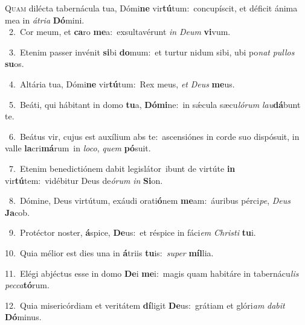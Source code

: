 \lettrine{\initial\textcolor{\initialcolor}{Q}}{uam} dilécta tabernácula tua, Dómi\textbf{ne} vir\-\textbf{tú}\-tum:~\star concupíscit, et déficit ánima mea in \textit{á}\-\textit{tri}\textit{a} \textbf{Dó}\-mini.\\
{\numbfont\textcolor{\numbcolor}{~2.}}~Cor meum, et \textbf{ca}\-ro \textbf{me}\-a:~\star exsultavérunt \textit{in} \textit{De}\-\textit{um} \textbf{vi}\-vum.\par
{\numbfont\textcolor{\numbcolor}{~3.}}~Etenim passer invénit \textbf{si}\-bi \textbf{do}\-mum:~\star et turtur nidum sibi, ubi po\textit{nat} \textit{pul}\-\textit{los} \textbf{su}\-os.\par
{\numbfont\textcolor{\numbcolor}{~4.}}~Altária tua, Dómi\textbf{ne} vir\-\textbf{tú}\-tum:~\star Rex meus, \textit{et} \textit{De}\-\textit{us} \textbf{me}\-us.\par
{\numbfont\textcolor{\numbcolor}{~5.}}~Beáti, qui hábitant in domo \textbf{tu}\-a, \textbf{Dó}\-\textbf{mi}ne:~\star in sǽcula sæcu\-\textit{ló}\-\textit{rum} \textit{lau}\-\textbf{dá}bunt te.\par
{\numbfont\textcolor{\numbcolor}{~6.}}~Beátus vir, cujus est auxílium abs te:~\dagger ascensiónes in corde suo dispósuit, in valle \textbf{la}\-cri\-\textbf{má}\-rum~\star in \textit{lo}\-\textit{co}, \textit{quem} \textbf{pó}\-suit.\par
{\numbfont\textcolor{\numbcolor}{~7.}}~Etenim benedictiónem dabit legislátor~\dagger ibunt de virtúte \textbf{in} vir\-\textbf{tú}\-tem:~\star vidébitur Deus de\-\textit{ó}\-\textit{rum} \textit{in} \textbf{Si}\-on.\par
{\numbfont\textcolor{\numbcolor}{~8.}}~Dómine, Deus virtútum, exáudi orati\-\textbf{ó}\-nem \textbf{me}\-am:~\star áuribus pérci\-\textit{pe}\-, \textit{De}\-\textit{us} \textbf{Ja}\-cob.\par
{\numbfont\textcolor{\numbcolor}{~9.}}~Protéctor noster, \textbf{á}\-spice, \textbf{De}\-us:~\star et réspice in fáci\textit{em} \textit{Chris}\-\textit{ti} \textbf{tu}\-i.\par
{\numbfont\textcolor{\numbcolor}{10.}}~Quia mélior est dies una in \textbf{á}\-triis \textbf{tu}\-is:~\star \textit{su}\-\textit{per} \textbf{míl}\-lia.\par
{\numbfont\textcolor{\numbcolor}{11.}}~Elégi abjéctus esse in domo \textbf{De}\-i \textbf{me}\-i:~\star magis quam habitáre in tabernácu\textit{lis} \textit{pec}\-\textit{ca}\textbf{tó}rum.\par
{\numbfont\textcolor{\numbcolor}{12.}}~Quia misericórdiam et veritátem \textbf{dí}\-ligit \textbf{De}\-us:~\star grátiam et glóri\textit{am} \textit{da}\-\textit{bit} \textbf{Dó}\-minus.\par
